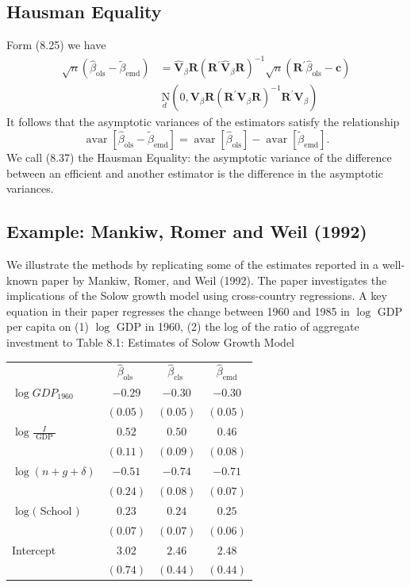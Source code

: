 \documentclass[10pt]{article}
\begin{document}
\subsection{Hausman Equality}
Form (8.25) we have
$$
\begin{aligned}
\sqrt{n}\left(\widehat{\beta}_{\mathrm{ols}}-\widetilde{\beta}_{\mathrm{emd}}\right) &=\widehat{\boldsymbol{V}}_{\beta} \boldsymbol{R}\left(\boldsymbol{R}^{\prime} \widehat{\boldsymbol{V}}_{\beta} \boldsymbol{R}\right)^{-1} \sqrt{n}\left(\boldsymbol{R}^{\prime} \widehat{\beta}_{\mathrm{ols}}-\boldsymbol{c}\right) \\
& \underset{d}{\mathrm{~N}}\left(0, \boldsymbol{V}_{\beta} \boldsymbol{R}\left(\boldsymbol{R}^{\prime} \boldsymbol{V}_{\beta} \boldsymbol{R}\right)^{-1} \boldsymbol{R}^{\prime} \boldsymbol{V}_{\beta}\right)
\end{aligned}
$$
It follows that the asymptotic variances of the estimators satisfy the relationship
$$
\operatorname{avar}\left[\widehat{\beta}_{\mathrm{ols}}-\widetilde{\beta}_{\mathrm{emd}}\right]=\operatorname{avar}\left[\widehat{\beta}_{\mathrm{ols}}\right]-\operatorname{avar}\left[\widetilde{\beta}_{\mathrm{emd}}\right] .
$$
We call (8.37) the Hausman Equality: the asymptotic variance of the difference between an efficient and another estimator is the difference in the asymptotic variances.

\subsection{Example: Mankiw, Romer and Weil (1992)}
We illustrate the methods by replicating some of the estimates reported in a well-known paper by Mankiw, Romer, and Weil (1992). The paper investigates the implications of the Solow growth model using cross-country regressions. A key equation in their paper regresses the change between 1960 and 1985 in $\log$ GDP per capita on (1) $\log$ GDP in 1960, (2) the log of the ratio of aggregate investment to Table 8.1: Estimates of Solow Growth Model

\begin{tabular}{lccc}
\hline\hline
 & $\widehat{\beta}_{\text {ols }}$ & $\widehat{\beta}_{\text {cls }}$ & $\widehat{\beta}_{\mathrm{emd}}$ \\
\cline { 2 - 4 }
$\log G D P_{1960}$ & $-0.29$ & $-0.30$ & $-0.30$ \\
 & $(0.05)$ & $(0.05)$ & $(0.05)$ \\
$\log \frac{I}{\text { GDP }}$ & $0.52$ & $0.50$ & $0.46$ \\
 & $(0.11)$ & $(0.09)$ & $(0.08)$ \\
$\log (n+g+\delta)$ & $-0.51$ & $-0.74$ & $-0.71$ \\
 & $(0.24)$ & $(0.08)$ & $(0.07)$ \\
$\log ($ School $)$ & $0.23$ & $0.24$ & $0.25$ \\
 & $(0.07)$ & $(0.07)$ & $(0.06)$ \\
Intercept & $3.02$ & $2.46$ & $2.48$ \\
 & $(0.74)$ & $(0.44)$ & $(0.44)$ \\
\hline
\end{tabular}
\end{document}
